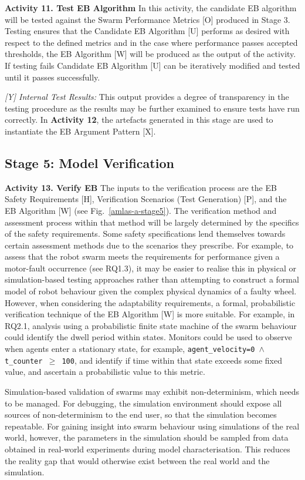 \documentclass[runningheads]{llncs}
\begin{document}
\noindent\textbf{Activity 11. Test EB Algorithm} In this activity, the candidate EB algorithm will be tested against the Swarm Performance Metrics [O] produced in Stage 3. Testing ensures that the Candidate EB Algorithm [U] performs as desired with respect to the defined metrics and in the case where performance passes accepted thresholds, the EB Algorithm [W] will be produced as the output of the activity. If testing fails Candidate EB Algorithm [U] can be iteratively modified and tested until it passes successfully.

\emph{[Y] Internal Test Results:} This output provides a degree of transparency in the testing procedure as the results may be further examined to ensure tests have run correctly. 
In \textbf{Activity 12}, the artefacts generated in this stage are used to instantiate the EB Argument Pattern [X].

\subsection{Stage 5: Model Verification} \label{framework-stage5}
\noindent\textbf{Activity 13. Verify EB} The inputs to the verification process are the EB Safety Requirements [H], Verification Scenarios (Test Generation) [P], and the EB Algorithm [W] (see Fig.~\ref{amlas-a-stage5}). 
%
The verification method and assessment process within that method will be largely determined by the specifics of the safety requirements. Some safety specifications lend themselves towards certain assessment methods due to the scenarios they prescribe. 
%
For example, to assess that the robot swarm meets the requirements for performance given a motor-fault occurrence (see RQ1.3), it may be easier to realise this in physical or simulation-based testing approaches rather than attempting to construct a formal model of robot behaviour given the complex physical dynamics of a faulty wheel. 
%
However, when considering the adaptability requirements, a formal, probabilistic verification technique of the EB Algorithm [W] is more suitable. For example, in RQ2.1, analysis using a probabilistic finite state machine of the swarm behaviour could identify the dwell period within states. Monitors could be used to observe when agents enter a stationary state, for example, \texttt{agent\_velocity=0 $\land $  t\_counter  $\ge$ 100}, and identify if time within that state exceeds some fixed value, and ascertain a probabilistic value to this metric.
%

Simulation-based validation of swarms may exhibit non-determinism, which needs to be managed. For debugging, the simulation environment should expose all sources of non-determinism to the end user, so that the simulation becomes repeatable. For gaining insight into swarm behaviour using simulations of the real world, however, the parameters in the simulation should be sampled from data obtained in real-world experiments during model characterisation. This reduces the reality gap that would otherwise exist between the real world and the simulation.
\end{document}
